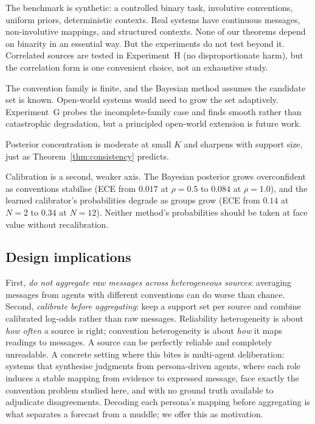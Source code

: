 The benchmark is synthetic: a controlled binary task, involutive
conventions, uniform priors, deterministic contexts. Real systems have
continuous messages, non-involutive mappings, and structured contexts.
None of our theorems depend on binarity in an essential way. But the
experiments do not test beyond it. Correlated sources are tested in
Experiment~H (no disproportionate harm), but the correlation form
is one convenient choice, not an exhaustive study.

The convention family is finite, and the Bayesian method assumes the
candidate set is known. Open-world systems would need to grow the set
adaptively. Experiment~G probes the incomplete-family case and finds smooth
rather than catastrophic degradation, but a principled open-world extension
is future work.

Posterior concentration is moderate at small $K$ and sharpens with support
size, just as Theorem~\ref{thm:consistency} predicts.

Calibration is a second, weaker axis. The Bayesian posterior grows
overconfident as conventions stabilise (ECE from $0.017$ at $\rho=0.5$ to
$0.084$ at $\rho=1.0$), and the learned calibrator's probabilities degrade
as groups grow (ECE from $0.14$ at $N=2$ to $0.34$ at $N=12$). Neither
method's probabilities should be taken at face value without
recalibration.

\subsection{Design implications}

First, \emph{do not aggregate raw messages across
heterogeneous sources}: averaging messages from agents with different
conventions can do worse than chance. Second, \emph{calibrate before
aggregating}: keep a support set per source and combine calibrated
log-odds rather than raw messages. Reliability heterogeneity is about
\emph{how often} a source is right; convention heterogeneity is about
\emph{how} it maps readings to messages. A source can be perfectly
reliable and completely unreadable. A concrete setting where this bites
is multi-agent deliberation: systems that synthesise judgments from
persona-driven agents, where each role induces a stable mapping from
evidence to expressed message, face exactly the convention problem
studied here, and with no ground truth available to adjudicate
disagreements. Decoding each persona's mapping before aggregating is
what separates a forecast from a muddle; we offer this as motivation.
